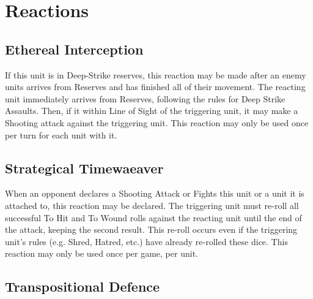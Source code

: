 \section{Reactions}

\subsection{Ethereal Interception} \label{Ethereal Interception}

If this unit is in Deep-Strike reserves, this reaction may be made after an enemy units arrives from Reserves and has finished all of their movement. The reacting unit immediately arrives from Reserves, following the rules for Deep Strike Assaults. Then, if it within Line of Sight of the triggering unit, it may make a Shooting attack against the triggering unit. This reaction may only be used once per turn for each unit with it. \\

\subsection{Strategical Timewaeaver} \label{Strategical Timeweaver}

When an opponent declares a Shooting Attack or Fights this unit or a unit it is attached to, this reaction may be declared. The triggering unit must re-roll all successful To Hit and To Wound rolls against the reacting unit until the end of the attack, keeping the second result. This re-roll occurs even if the triggering unit's rules (e.g. Shred, Hatred, etc.) have already re-rolled these dice. This reaction may only be used once per game, per unit.

\subsection{Transpositional Defence} \label{Transpositional Defence}
